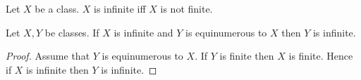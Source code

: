 \documentclass[10pt]{article}
\begin{document}
  \begin{forthel}
    \begin{definition}[id=FOUNDATIONS_14_6612510618681344,printid]
      Let $X$ be a class.
      $X$ is infinite iff $X$ is not finite.
    \end{definition}
  \end{forthel}

  \begin{forthel}
    \begin{proposition}[id=FOUNDATIONS_14_5814530911240192,printid]
      Let $X, Y$ be classes.
      If $X$ is infinite and $Y$ is equinumerous to $X$ then $Y$ is infinite.
    \end{proposition}
    \begin{proof}
      Assume that $Y$ is equinumerous to $X$.
      If $Y$ is finite then $X$ is finite.
      Hence if $X$ is infinite then $Y$ is infinite.
    \end{proof}
  \end{forthel}
\end{document}
